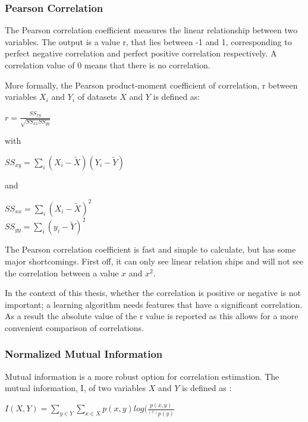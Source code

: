 \subsubsection{Pearson Correlation}
The Pearson correlation coefficient measures the linear relationship between two variables. The output is a value r, that lies between -1 and 1, corresponding to perfect negative correlation and perfect positive correlation respectively. A correlation value of 0 means that there is no correlation.

\npar

More formally\citep{corrPaper}, the Pearson product-moment coefficient of correlation, r between variables $X_i$ and $Y_i$ of datasets $X$ and $Y$ is defined as:

\begin{center}
$r = \frac{SS_{xy}}{\sqrt{SS_{xx}SS_{yy}}}$
\end{center}
with
\begin{center}
$SS_{xy} = \sum\limits_i (X_i-\tilde{X})(Y_i-\tilde{Y})$
\end{center}
and
\begin{center}
$SS_{xx} = \sum\limits_i (X_i-\tilde{X})^2$ \\
$SS_{yy} = \sum\limits_i (y_i-\tilde{Y})^2$
\end{center}

\npar

The Pearson correlation coefficient is fast and simple to calculate, but has some major shortcomings. First off, it can only see linear relation ships and will not see the correlation between a value $x$ and $x^2$.

\npar

In the context of this thesis, whether the correlation is positive or negative is not important; a learning algorithm needs features that have a significant correlation. As a result the absolute value of the r value is reported as this allows for a more convenient comparison of correlations.

\subsubsection{Normalized Mutual Information}
Mutual information is a more robust option for correlation estimation. The mutual information, I, of two variables $X$ and $Y$ is defined as \citep{mutPaper}:
\begin{center}
$I(X,Y) = \sum\limits_{y\in Y} \sum\limits_{x\in X} p(x,y)log(\frac{p(x,y)}{^(x)p(y)}$
\end{center}

